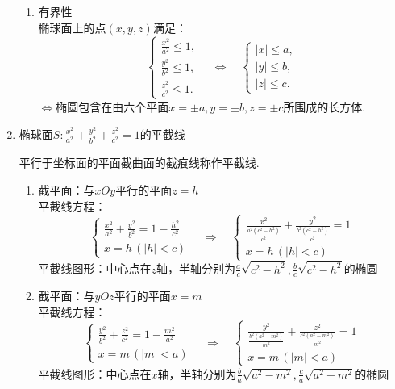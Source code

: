 \begin{enumerate}
\begin{enumerate}
	\item 有界性\\
	\kg \kg 椭球面上的点$(x,y,z)$满足：
	\begin{equation*}
	\begin{cases}
	\displaystyle  \frac{x^2}{a^2}\le 1,\\
	\displaystyle  \frac{y^2}{b^2} \le 1,\\
	\displaystyle  \frac{z^2}{c^2} \le 1. 
	\end{cases}
\quad \Longleftrightarrow \quad
	\begin{cases}
	|x| \le a,\\
	|y| \le b,\\
	|z| \le c.
	\end{cases}
	\end{equation*}
	$\Longleftrightarrow$椭圆包含在由六个平面$x=\pm a,y=\pm b,z=\pm c$所围成的长方体.
\end{enumerate}

\item  椭球面$\displaystyle S:\frac{x^2}{a^2}+\frac{y^2}{b^2}+\frac{z^2}{c^2}=1$的平截线
\jg

\enbelowdefination[平截线]
\kg 平行于坐标面的平面截曲面的截痕线称作{\color{dy}平截线}.
\begin{enumerate}
	\setlength{\itemindent}{1em}
	\setlength{\topsep}{0.01em}
	\setlength{\itemsep}{0.01em}
	\item 截平面：与$xOy$平行的平面$ z = h $ \\ 
	\kg 平截线方程：
	\begin{equation*}
	\begin{cases}
	\displaystyle \frac{x^2}{a^2} + \frac{y^2}{b^2}=1- \frac{h^2}{c^2}\\
	x=h \, (|h|<c)
	\end{cases}
	\quad \Longrightarrow \quad 
	\begin{cases}
	\displaystyle \frac{x^2}{\frac{a^2(c^2-h^2)}{c^2}} + \frac{y^2}{\frac{b^2(c^2-h^2)}{c^2}}=1\\
	x=h \, (|h|<c)
	\end{cases}
	\end{equation*}
	 \kg 平截线图形：中心点在$z$轴，半轴分别为$\displaystyle \frac{a}{c}\sqrt{c^2-h^2},\frac{b}{c}\sqrt{c^2-h^2}$的椭圆
	
	\item 截平面：与$yOz$平行的平面$ x = m $\\
	\kg 平截线方程：
	\begin{equation*}
	\begin{cases}
	\displaystyle \frac{y^2}{b^2} + \frac{z^2}{c^2}=1- \frac{m^2}{a^2}\\
	x=m\,(|m|<a)
	\end{cases}
	\quad \Longrightarrow \quad 
	\begin{cases}
	\displaystyle \frac{y^2}{\frac{b^2(a^2-m^2)}{m^2}} + \frac{z^2}{\frac{c^2(a^2-m^2)}{m^2}}=1\\
	x=m \, (|m|<a)
	\end{cases}
	\end{equation*}
	\kg 平截线图形：中心点在$x$轴，半轴分别为$\displaystyle \frac{b}{a}\sqrt{a^2-m^2},\frac{c}{a}\sqrt{a^2-m^2}$的椭圆
	

\end{enumerate}
\end{enumerate}
